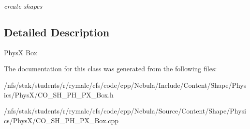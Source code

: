 \begin{DoxyCompactItemize}
\begin{DoxyCompactList}\small\item\em create shapes \item\end{DoxyCompactList}\end{DoxyCompactItemize}


\subsection{Detailed Description}
PhysX Box 

The documentation for this class was generated from the following files:\begin{DoxyCompactItemize}
\item 
/nfs/stak/students/r/rymalc/cfs/code/cpp/Nebula/Include/Content/Shape/Physics/PhysX/CO\_\-SH\_\-PH\_\-PX\_\-Box.h\item 
/nfs/stak/students/r/rymalc/cfs/code/cpp/Nebula/Source/Content/Shape/Physics/PhysX/CO\_\-SH\_\-PH\_\-PX\_\-Box.cpp\end{DoxyCompactItemize}
